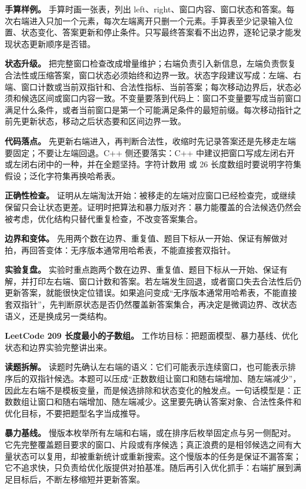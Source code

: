 \textbf{手算样例。} 手算时画一张表，列出 left、right、窗口内容、窗口状态和答案。每次右端进入只加一个元素，每次左端离开只删一个元素。手算表至少记录输入位置、状态变化、答案更新和停止条件。只写最终答案看不出边界，逐轮记录才能发现状态更新顺序是否错。

\textbf{状态升级。} 把完整窗口检查改成增量维护；右端负责引入新信息，左端负责恢复合法性或压缩答案，窗口状态必须始终和边界一致。状态字段建议写成：左端、右端、窗口计数或当前双指针和、合法性指标、当前答案；每次移动边界后，状态必须和候选区间或窗口内容一致。不变量要落到代码上：窗口不变量要写成当前窗口满足什么条件，或者当前窗口是第一个可能满足条件的最短前缀。每次移动指针之前先更新状态，移动之后状态要和区间边界一致。

\textbf{代码落点。} 先更新右端进入，再判断合法性，收缩时先记录答案还是先移走左端要固定；不要让左端回退。C++ 侧还要落实：C++ 中建议把窗口写成左闭右开或左闭右闭中的一种，并在全题坚持。字符计数用  或 26 长度数组时要说明字符集假设；泛化字符集再换哈希表。

\textbf{正确性检查。} 证明从左端淘汰开始：被移走的左端对应窗口已经检查完，或继续保留只会让状态更差。证明时把算法和暴力版对齐：暴力能覆盖的合法候选仍然会被考虑，优化结构只替代重复检查，不改变答案集合。

\textbf{边界和变体。} 先用两个数在边界、重复值、题目下标从一开始、保证有解做对拍，再回答变体：无序版本通常用哈希表，不能直接套双指针。

\textbf{实验复盘。} 实验时重点跑两个数在边界、重复值、题目下标从一开始、保证有解，并打印左右端、窗口计数和答案。若左端发生回退，或者窗口失去合法性后仍更新答案，就能很快定位错误。如果追问变成“无序版本通常用哈希表，不能直接套双指针”，先判断原状态是否仍然覆盖新答案集合，再决定是微调边界、改状态语义，还是换成另一类结构。

\noindent\textbf{LeetCode 209 长度最小的子数组。} 工作坊目标：把题面模型、暴力基线、优化状态和边界实验完整讲出来。

\textbf{读题拆解。} 读题时先确认左右端的语义：它们可能表示连续窗口，也可能表示排序后的双指针候选。本题可以压成“正数数组让窗口和随右端增加、随左端减少”，因此左右端不是模板变量，而是候选排除和状态变化的触发点。一句话模型是：正数数组让窗口和随右端增加、随左端减少。这里要先确认答案对象、合法性条件和优化目标，不要把题型名字当成推导。

\textbf{暴力基线。} 慢版本枚举所有左端和右端，或在排序后枚举固定点与另一侧配对。它先完整覆盖题目要求的窗口、片段或有序候选；真正浪费的是相邻候选之间有大量状态可以复用，却被重新统计或重新搜索。这个慢版本的任务是保证不漏答案；它不追求快，只负责给优化版提供对拍基准。随后再引入优化抓手：右端扩展到满足目标后，不断左移缩短并更新答案。


